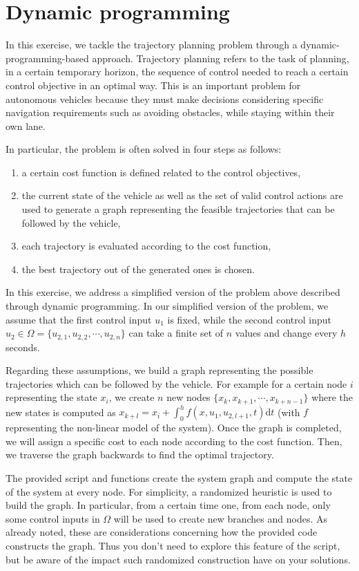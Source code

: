 \setcounter{chapter}{2}
\chapter{Dynamic programming}
	In this exercise, we tackle the trajectory planning problem through a dynamic-programming-based approach.
	Trajectory planning refers to the task of planning, in a certain temporary horizon, the sequence of control needed to reach a certain control objective in an optimal way. 
	This is an important problem for autonomous vehicles because they must make decisions considering specific navigation requirements such as avoiding obstacles, while staying within their own lane. 
	\par
	In particular, the problem is often solved in four steps as follows:
	\begin{enumerate}
		\item a certain cost function is defined related to the control objectives,
		\item the current state of the vehicle as well as the set of valid control actions are used to generate a graph representing the feasible trajectories that can be followed by the vehicle,
		\item each trajectory is evaluated according to the cost function,
		\item the best trajectory out of the generated ones is chosen.
	\end{enumerate} 
	In this exercise, we address a simplified version of the problem above described through dynamic programming. 
	In our simplified version of the problem, we assume that the first control input %
	$u_1$ %
	is fixed, while the second control input %
	$u_2 \in\Omega = \lbrace u_{2,1}, u_{2,2}, \cdots, u_{2,n} \rbrace$ %
	can take a finite set of %
	$n$ %
	values and change every %
	$h$ %
	seconds.
	\par
	Regarding these assumptions, we build a graph representing the possible trajectories which can be followed by the vehicle.
	For example for a certain node %
	$i$ %
	representing the state %
	$x_i$, %
	we create %
	$n$ %
	new nodes %
	$\lbrace x_k, x_{k+1}, \cdots, x_{k+n-1}\rbrace$ %
	where the new states is computed as %
	$x_{k+l} = x_{i} + \int_0^h f(x,u_1, u_{2, l+1},t) \text{d}t$ %
	(with %
	$f$ %
	representing the non-linear model of the system).
	Once the graph is completed, we will assign a specific cost to each node according to the cost function. 
	Then, we traverse the graph backwards to find the optimal trajectory. 
	\par
	The provided script and functions create the system graph and compute the state of the system at every node.
	For simplicity, a randomized heuristic is used to build the graph.
	In particular, from a certain time one, from each node, only some control inputs in %
	$\Omega$ %
	will be used to create new branches and nodes. 
	As already noted, these are considerations concerning how the provided code constructs the graph. 
	Thus you don't need to explore this feature of the script, but be aware of the impact such randomized construction have on your solutions. 
